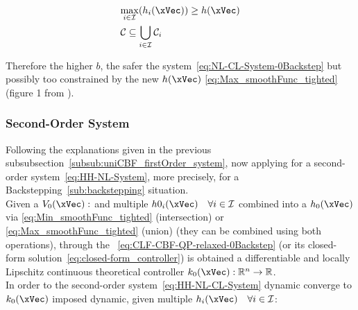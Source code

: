 \begin{description}
    \begin{subequations}
        \begin{align}
            &\underset{i \in \mathcal{I}}{\max} (h_i(\xVec)) \geq h(\xVec) %
            \label{eq:Union_CBF_Comparation_tighted} \\
            &\mathcal{C} \subseteq \bigcup_{i \in \mathcal{I}} \mathcal{C}_i
            \label{eq:Union_SafeSet_Comparation_tighted}
        \end{align}
    \end{subequations}

    Therefore the higher \(b\), the safer the system~\eqref{eq:NL-CL-System-0Backstep} but possibly too constrained by the new  \(h(\xVec)\) \eqref{eq:Max_smoothFunc_tighted} (figure 1 from \cite{molnar2023composing}). 
\end{description}



\subsubsection{Second-Order System}
\label{subsub:uniCBF_secondOrder_system}

Following the explanations given in the previous subsubsection~\ref{subsub:uniCBF_firstOrder_system}, now applying for a second-order system~\eqref{eq:HH-NL-System}, more precisely, for a Backstepping~\ref{sub:backstepping} situation. \\

Given a  \(V_0(\xVec): \) and multiple  \(h0_i(\xVec) \quad \forall i \in \mathcal{I}\) combined into a  \(h_0(\xVec)\) via \eqref{eq:Min_smoothFunc_tighted} (intersection) or \eqref{eq:Max_smoothFunc_tighted} (union) (they can be combined using both operations), through the ~\eqref{eq:CLF-CBF-QP-relaxed-0Backstep} (or its closed-form solution~\eqref{eq:closed-form_controller}) is obtained a differentiable and locally Lipschitz continuous theoretical controller \(k_0(\xVec): \mathbb{R}^n \to \mathbb{R}\). \\

In order to the second-order system~\eqref{eq:HH-NL-CL-System} dynamic converge to \(k_0(\xVec)\) imposed dynamic, given multiple  \(h_i(\xVec) \quad \forall i \in \mathcal{I} \):

